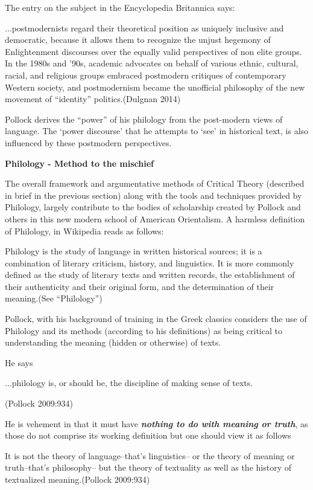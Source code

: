 The entry on the subject in the Encyclopedia Britannica says:
\begin{myquote}
...postmodernists regard their theoretical position as uniquely inclusive and democratic, because it allows them to recognize the unjust hegemony of Enlightenment discourses over the equally valid perspectives of non elite groups. In the 1980s and '90s, academic advocates on behalf of various ethnic, cultural, racial, and religious groups embraced postmodern critiques of contemporary Western society, and postmodernism became the unofficial philosophy of the new movement of ``identity'' politics.\hfill (Dulgnan 2014)
\end{myquote}

Pollock derives the ``power'' of his philology from the post-modern views of language. The `power discourse' that he attempts to `see' in historical text, is also influenced by these postmodern perspectives.

{\bf Philology - Method to the mischief}

The overall framework and argumentative methods of Critical Theory (described in brief in the previous section) along with the tools and techniques provided by Philology, largely contribute to the bodies of scholarship created by Pollock and others in this new modern school of American Orientalism. A harmless definition of Philology, in Wikipedia reads as follows:
\begin{myquote}
Philology is the study of language in written historical sources; it is a combination of literary criticism, history, and linguistics. It is more commonly defined as the study of literary texts and written records, the establishment of their authenticity and their original form, and the determination of their meaning.\hfill (See ``Philology'')
\end{myquote}

Pollock, with his background of training in the Greek classics considers the use of Philology and its methods (according to his definitions) as being critical to understanding the meaning (hidden or otherwise) of texts.

He says 
\begin{myquote}
...philology is, or should be, the discipline of making sense of texts.

\hfill (Pollock 2009:934)
\end{myquote}

He is vehement in that it must have {{\sl\bfseries nothing to do with meaning or truth}\relax}, as those do not comprise its working definition but one should view it as follows
\begin{myquote}
It is not the theory of language--that's linguistics-- or the theory of meaning or truth--that's philosophy-- but the theory of textuality as well as the history of textualized meaning.\hfill (Pollock 2009:934)
\end{myquote}

